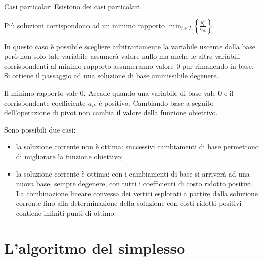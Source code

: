 \documentclass{beamer}
\begin{document}
\begin{frame}[allowframebreaks]{Casi particolari}
Esistono dei casi particolari.

 Pi\`u soluzioni corrispondono ad un minimo rapporto
$\min_{i \in I} \left\lbrace\frac{b_i^S}{a_{ik}}\right\rbrace$.

In questo caso \`e possibile scegliere  arbitrariamente la variabile
uscente dalla base per\`o non solo tale variabile assumer\`a valore
nullo ma anche le altre variabili corrispondenti al minimo rapporto
assumeranno valore 0 pur rimanendo in base.
Si ottiene il passaggio ad una soluzione di base ammissibile degenere.

 Il minimo rapporto vale 0.
Accade quando una variabile di base vale 0 e il corrispondente
coefficiente $a_{ik} $ \`e positivo. Cambiando base a seguito
dell'operazione di pivot non cambia il valore della funzione
obiettivo.

Sono possibili due casi:
\begin{itemize}
\item la soluzione corrente non \`e ottima:
successivi cambiamenti di base permettono
di migliorare la funzione obiettivo;

\item la soluzione corrente \`e ottima:
con i cambiamenti di base si arriver\`a ad una nuova base,
sempre degenere, con tutti i coefficienti di costo ridotto
positivi.
La combinazione lineare convessa dei vertici esplorati a partire
dalla soluzione corrente fino alla determinazione della soluzione
con costi ridotti positivi contiene infiniti punti di ottimo.
\end{itemize}
\end{frame}

\section{L'algoritmo del simplesso}
\end{document}
